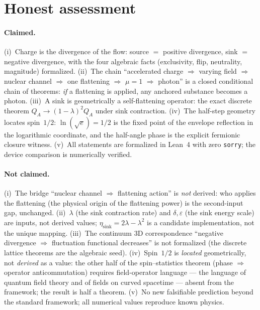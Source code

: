 \documentclass[aps,prd,preprint,superscriptaddress,amsmath,amssymb]{revtex4-2}
\begin{document}
\section{Honest assessment}
\label{sec:honest}

\paragraph{Claimed.}
(i)~Charge is the divergence of the flow: source $=$ positive
divergence, sink $=$ negative divergence, with the four algebraic
facts (exclusivity, flip, neutrality, magnitude) formalized.
(ii)~The chain ``accelerated charge $\Rightarrow$ varying field
$\Rightarrow$ nuclear channel $\Rightarrow$ one flattening
$\Rightarrow$ $\mu=1$ $\Rightarrow$ photon'' is a closed conditional
chain of theorems: \emph{if} a flattening is applied, any anchored
substance becomes a photon.  (iii)~A sink is geometrically a
self-flattening operator: the exact discrete theorem
$Q_A\to(1-\lambda)^2 Q_A$ under sink contraction.  (iv)~The half-step
geometry locates spin~$1/2$: $\ln(\sqrt e)=1/2$ is the fixed point of
the envelope reflection in the logarithmic coordinate, and the
half-angle phase is the explicit fermionic closure witness.
(v)~All statements are formalized in Lean~4 with zero
\texttt{sorry}; the device comparison is numerically verified.

\paragraph{Not claimed.}
(i)~The bridge ``nuclear channel $\Rightarrow$ flattening action''
is \emph{not} derived: who applies the flattening (the physical
origin of the flattening power) is the second-input gap, unchanged.
(ii)~$\lambda$ (the sink contraction rate) and $\delta,\varepsilon$
(the sink energy scale) are inputs, not derived values;
$\eta_{\text{sink}}=2\lambda-\lambda^2$ is a candidate implementation,
not the unique mapping.  (iii)~The continuum 3D correspondence
``negative divergence $\Rightarrow$ fluctuation functional decreases''
is not formalized (the discrete lattice theorems are the algebraic
seed).  (iv)~Spin~$1/2$ is \emph{located} geometrically, not
\emph{derived} as a value: the other half of the
spin--statistics theorem (phase $\Rightarrow$ operator anticommutation)
requires field-operator language --- the language of quantum field
theory and of fields on curved spacetime
\cite{weinberg1995quantum,wald1994quantum} --- absent from the
framework; the result is half a theorem.  (v)~No new falsifiable
prediction beyond the standard framework; all numerical values
reproduce known physics.
\end{document}
